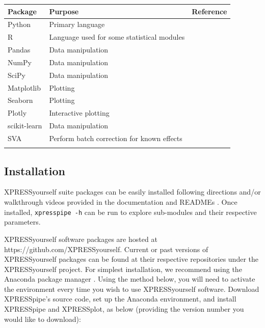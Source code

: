 \documentclass[10pt, oneside]{article}
\begin{document}
\begin{table}[h]
    \centering
{}
\begin{tabular}{p{2.4cm}p{7.5cm}p{3cm}}
 \textbf{Package} & \textbf{Purpose} & \textbf{Reference} \\
 \hline
 Python & Primary language & \\
 \hline
 R & Language used for some statistical modules & \\
 \hline
 Pandas & Data manipulation & \cite{pandas} \\
 \hline
 NumPy & Data manipulation & \cite{numpy1, numpy2} \\
 \hline
 SciPy & Data manipulation & \cite{scipy} \\
 \hline
 Matplotlib & Plotting & \cite{matplotlib} \\
 \hline
 Seaborn & Plotting & \cite{seaborn} \\
 \hline
 Plotly & Interactive plotting & \cite{plotly} \\
 \hline
 scikit-learn & Data manipulation & \cite{sklearn} \\
 \hline
 SVA & Perform batch correction for known effects & \cite{sva} \\
 \label{Tab:software_plot}
 \end{tabular}
\end{table}

\subsection*{Installation}
XPRESSyourself suite packages can be easily installed following directions and/or walkthrough videos provided in the documentation and READMEs \cite{xpressyourself, xpresspipe_docs, xpressplot_docs}. Once installed, \texttt{xpresspipe -h} can be run to explore sub-modules and their respective parameters. \par

XPRESSyourself software packages are hosted at https://github.com/XPRESSyourself. Current or past versions of XPRESSyourself packages can be found at their respective repositories under the XPRESSyourself project. For simplest installation, we recommend using the Anaconda package manager \cite{anaconda}. Using the method below, you will need to activate the environment every time you wish to use XPRESSyourself software. Download XPRESSpipe's source code, set up the Anaconda environment, and install XPRESSpipe and XPRESSplot, as below (providing the version number you would like to download):
\end{document}
